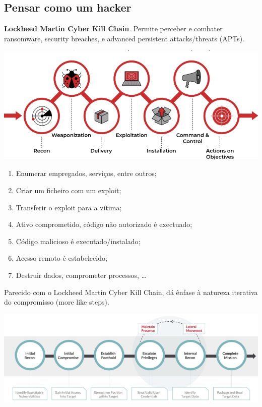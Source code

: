 \documentclass{article}
\begin{document}
\subsection{Pensar como um hacker}

\begin{flushleft}
  \textbf{Lockheed Martin Cyber Kill Chain}. Permite perceber e combater ransomware,
  security breaches, e advanced persistent attacks/threats (APTs).
\end{flushleft}

\begin{center}
  \includegraphics[scale=0.3]{46}
\end{center}

\begin{flushleft}
  \begin{enumerate}
    \item Enumerar empregados, serviços, entre outros;
    \item Criar um ficheiro com um exploit;
    \item Transferir o exploit para a vítima;
    \item Ativo comprometido, código não autorizado é exectuado;
    \item Código malicioso é executado/instalado;
    \item Acesso remoto é estabelecido;
    \item Destruir dados, comprometer processos, \dots
  \end{enumerate}

  \vspace{2mm}

  Parecido com o Lockheed Martin Cyber Kill Chain, dá ênfase à natureza iterativa
  do compromisso (more like steps).

  \begin{center}
    \includegraphics[scale=0.3]{47}
  \end{center}
\end{flushleft}
\end{document}
